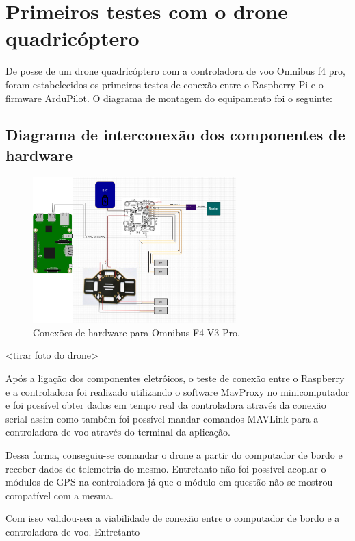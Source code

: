\documentclass[12pt,a4paper,oneside]{book}
\begin{document}
\section{Primeiros testes com o drone quadricóptero}

De posse de um drone quadricóptero com a controladora de voo Omnibus f4 pro, foram estabelecidos os primeiros testes de conexão entre o Raspberry Pi e o firmware ArduPilot. O diagrama de montagem do equipamento foi o seguinte:

\subsection{Diagrama de interconexão dos componentes de hardware}
%
\begin{figure}[!htbp]
  \centering
  \includegraphics[width=0.7\textwidth]{Images/Diagramas/hardware_connections.png}
  \caption{Conexões de hardware para Omnibus F4 V3 Pro.}
  \label{fig:hardware_connections.png.0}
\end{figure}
%
<tirar foto do drone>

Após a ligação dos componentes eletrôicos, o teste de conexão entre o Raspberry e a controladora foi realizado utilizando o software MavProxy no minicomputador e foi possível obter dados em tempo real da controladora através da conexão serial assim como também foi possível mandar comandos MAVLink para a controladora de voo através do terminal da aplicação.

Dessa forma, conseguiu-se comandar o drone a partir do computador de bordo e receber dados de telemetria do mesmo. Entretanto não foi possível acoplar o módulos de GPS na controladora já que o módulo em questão não se mostrou compatível com a mesma.

Com isso validou-sea a viabilidade de conexão entre o computador de bordo e a controladora de voo. Entretanto
\end{document}
